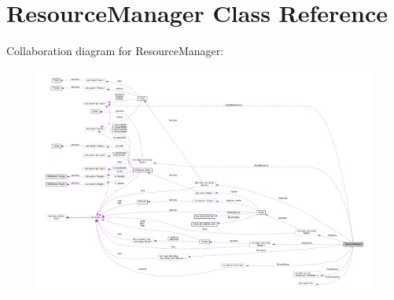 \hypertarget{class_resource_manager}{}\section{Resource\+Manager Class Reference}
\label{class_resource_manager}


Collaboration diagram for Resource\+Manager\+:
\nopagebreak
\begin{figure}[H]
\begin{center}
\leavevmode
\includegraphics[width=350pt]{class_resource_manager__coll__graph}
\end{center}
\end{figure}
